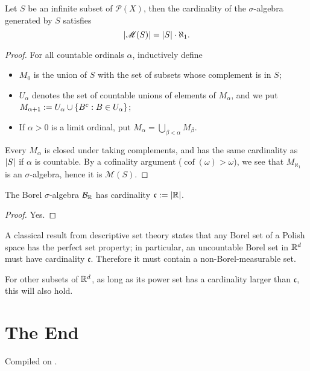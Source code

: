 \documentclass{article}
\begin{document}
\begin{proposition}
    Let $S$ be an infinite subset of $\mathcal{P}(X)$, then the cardinality of the $\sigma$-algebra generated by $S$ satisfies
    \[
        \left\vert\mathscr{M}(S)\right\vert = \left\vert S\right\vert\cdot\aleph_1.
    \]
\end{proposition}

\begin{proof}
    For all countable ordinals $\alpha$, inductively define
    \begin{itemize}[nosep]
        \item $M_0$ is the union of $S$ with the set of subsets whose complement is in $S$;
        \item $U_{\alpha}$ denotes the set of countable unions of elements of $M_\alpha$, and we put $M_{\alpha+1}:=U_{\alpha}\cup\left\{B^c:B\in U_{\alpha}\right\}$;
        \item If $\alpha>0$ is a limit ordinal, put $M_\alpha=\bigcup_{\beta<\alpha}M_\beta$.
    \end{itemize}
    Every $M_\alpha$ is closed under taking complements, and has the same cardinality as $\left\vert S\right\vert$ if $\alpha$ is countable. By a cofinality argument ($\operatorname{cof}(\omega)>\omega$), we see that $M_{\aleph_1}$ is an $\sigma$-algebra, hence it is $\mathscr{M}(S)$. 
\end{proof}

\begin{corollary}
    The Borel $\sigma$-algebra $\mathcal{B}_{\mathbb{R}}$ has cardinality $\mathfrak{c}:=\left\vert\mathbb{R}\right\vert$.
\end{corollary}

\begin{proof}
    Yes.
\end{proof}

A classical result from descriptive set theory states that any Borel set of a Polish space has the perfect set property; in particular, an uncountable Borel set in $\mathbb{R}^d$ must have cardinality $\mathfrak{c}$. Therefore it must contain a non-Borel-measurable set.

For other subsets of $\mathbb{R}^d$, as long as its power set has a cardinality larger than $\mathfrak{c}$, this will also hold.

\section*{The End}



\noindent Compiled on \todayymd.

\noindent\home
\end{document}
